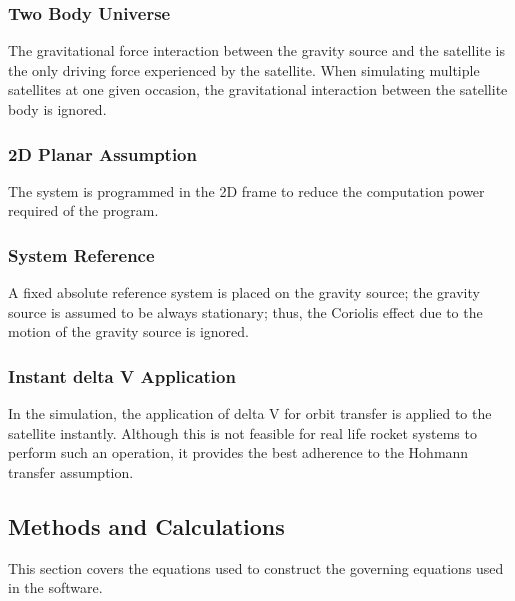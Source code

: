 \documentclass[12pt, letter]{article}
\begin{document}
\subsubsection {Two Body Universe}
	The gravitational force interaction between the gravity source and the satellite is the only driving force experienced by the satellite. When simulating multiple satellites at one given occasion, the gravitational interaction between the satellite body is ignored.
\subsubsection {2D Planar Assumption}
	The system is programmed in the 2D frame to reduce the computation power required of the program.  
\subsubsection {System Reference}
	A fixed absolute reference system is placed on the gravity source; the gravity source is assumed to be always stationary; thus, the Coriolis effect due to the motion of the gravity source is ignored.
\subsubsection {Instant delta V Application}
	In the simulation, the application of delta V for orbit transfer is applied to the satellite instantly. Although this is not feasible for real life rocket systems to perform such an operation, it provides the best adherence to the Hohmann transfer assumption.



\subsection{Methods and Calculations} \label{sec:theory}
This section covers the equations used to construct the governing equations used in the software.
\end{document}
